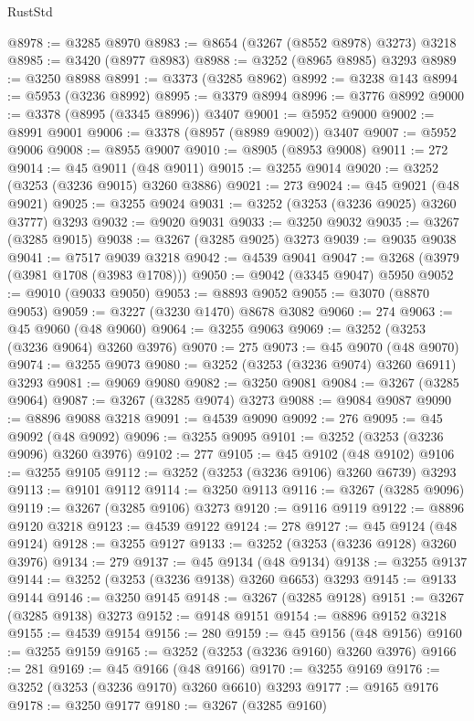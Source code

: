 \begin{lexlean}{RustStd}
\begin{coremodule}
@8978 := @3285 @8970
@8983 := @8654 (@3267 (@8552 @8978) @3273) @3218
@8985 := @3420 (@8977 @8983)
@8988 := @3252 (@8965 @8985) @3293
@8989 := @3250 @8988
@8991 := @3373 (@3285 @8962)
@8992 := @3238 @143
@8994 := @5953 (@3236 @8992)
@8995 := @3379 @8994
@8996 := @3776 @8992
@9000 := @3378 (@8995 (@3345 @8996)) @3407
@9001 := @5952 @9000
@9002 := @8991 @9001
@9006 := @3378 (@8957 (@8989 @9002)) @3407
@9007 := @5952 @9006
@9008 := @8955 @9007
@9010 := @8905 (@8953 @9008)
@9011 := 272
@9014 := @45 @9011 (@48 @9011)
@9015 := @3255 @9014
@9020 := @3252 (@3253 (@3236 @9015) @3260 @3886)
@9021 := 273
@9024 := @45 @9021 (@48 @9021)
@9025 := @3255 @9024
@9031 := @3252 (@3253 (@3236 @9025) @3260 @3777) @3293
@9032 := @9020 @9031
@9033 := @3250 @9032
@9035 := @3267 (@3285 @9015)
@9038 := @3267 (@3285 @9025) @3273
@9039 := @9035 @9038
@9041 := @7517 @9039 @3218
@9042 := @4539 @9041
@9047 := @3268 (@3979 (@3981 @1708 (@3983 @1708)))
@9050 := @9042 (@3345 @9047) @5950
@9052 := @9010 (@9033 @9050)
@9053 := @8893 @9052
@9055 := @3070 (@8870 @9053)
@9059 := @3227 (@3230 @1470) @8678 @3082
@9060 := 274
@9063 := @45 @9060 (@48 @9060)
@9064 := @3255 @9063
@9069 := @3252 (@3253 (@3236 @9064) @3260 @3976)
@9070 := 275
@9073 := @45 @9070 (@48 @9070)
@9074 := @3255 @9073
@9080 := @3252 (@3253 (@3236 @9074) @3260 @6911) @3293
@9081 := @9069 @9080
@9082 := @3250 @9081
@9084 := @3267 (@3285 @9064)
@9087 := @3267 (@3285 @9074) @3273
@9088 := @9084 @9087
@9090 := @8896 @9088 @3218
@9091 := @4539 @9090
@9092 := 276
@9095 := @45 @9092 (@48 @9092)
@9096 := @3255 @9095
@9101 := @3252 (@3253 (@3236 @9096) @3260 @3976)
@9102 := 277
@9105 := @45 @9102 (@48 @9102)
@9106 := @3255 @9105
@9112 := @3252 (@3253 (@3236 @9106) @3260 @6739) @3293
@9113 := @9101 @9112
@9114 := @3250 @9113
@9116 := @3267 (@3285 @9096)
@9119 := @3267 (@3285 @9106) @3273
@9120 := @9116 @9119
@9122 := @8896 @9120 @3218
@9123 := @4539 @9122
@9124 := 278
@9127 := @45 @9124 (@48 @9124)
@9128 := @3255 @9127
@9133 := @3252 (@3253 (@3236 @9128) @3260 @3976)
@9134 := 279
@9137 := @45 @9134 (@48 @9134)
@9138 := @3255 @9137
@9144 := @3252 (@3253 (@3236 @9138) @3260 @6653) @3293
@9145 := @9133 @9144
@9146 := @3250 @9145
@9148 := @3267 (@3285 @9128)
@9151 := @3267 (@3285 @9138) @3273
@9152 := @9148 @9151
@9154 := @8896 @9152 @3218
@9155 := @4539 @9154
@9156 := 280
@9159 := @45 @9156 (@48 @9156)
@9160 := @3255 @9159
@9165 := @3252 (@3253 (@3236 @9160) @3260 @3976)
@9166 := 281
@9169 := @45 @9166 (@48 @9166)
@9170 := @3255 @9169
@9176 := @3252 (@3253 (@3236 @9170) @3260 @6610) @3293
@9177 := @9165 @9176
@9178 := @3250 @9177
@9180 := @3267 (@3285 @9160)

\end{coremodule}
\end{lexlean}
